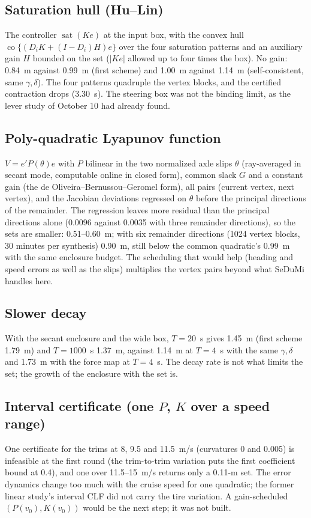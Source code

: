 \documentclass[11pt]{article}
\begin{document}
\subsection{Saturation hull (Hu--Lin)}
The controller $\operatorname{sat}(Ke)$ at the input box, with the convex
hull $\operatorname{co}\{(D_iK+(I-D_i)H)e\}$ over the four saturation
patterns and an auxiliary gain $H$ bounded on the set ($|Ke|$ allowed up to
four times the box). No gain: 0.84~m against 0.99~m (first scheme) and
1.00~m against 1.14~m (self-consistent, same $\gamma,\delta$). The four
patterns quadruple the vertex blocks, and the certified contraction drops
(3.30~s). The steering box was not the binding limit, as the lever study of
October 10 had already found.

\subsection{Poly-quadratic Lyapunov function}
$V=e'P(\theta)e$ with $P$ bilinear in the two normalized axle slips
$\theta$ (ray-averaged in secant mode, computable online in closed form),
common slack $G$ and a constant gain (the de Oliveira--Bernussou--Geromel
form), all pairs (current vertex, next vertex), and the Jacobian deviations
regressed on $\theta$ before the principal directions of the remainder. The
regression leaves more residual than the principal directions alone (0.0096
against 0.0035 with three remainder directions), so the sets are smaller:
0.51--0.60~m; with six remainder directions (1024 vertex blocks, 30 minutes
per synthesis) 0.90~m, still below the common quadratic's 0.99~m with the
same enclosure budget. The scheduling that would help (heading and speed
errors as well as the slips) multiplies the vertex pairs beyond what SeDuMi
handles here.

\subsection{Slower decay}
With the secant enclosure and the wide box, $T=20$~s gives 1.45~m (first
scheme 1.79~m) and $T=1000$~s 1.37~m, against 1.14~m at $T=4$~s with the
same $\gamma,\delta$ and 1.73~m with the force map at $T=4$~s. The decay
rate is not what limits the set; the growth of the enclosure with the set
is.

\subsection{Interval certificate (one $P$, $K$ over a speed range)}
One certificate for the trims at 8, 9.5 and 11.5~m/s (curvatures 0 and
0.005) is infeasible at the first round (the trim-to-trim variation puts the
first coefficient bound at 0.4), and one over 11.5--15~m/s returns only a
0.11-m set. The error dynamics change too much with the cruise speed for one
quadratic; the former linear study's interval CLF did not carry the tire
variation. A gain-scheduled $(P(v_0),K(v_0))$ would be the next step; it was
not built.
\end{document}

